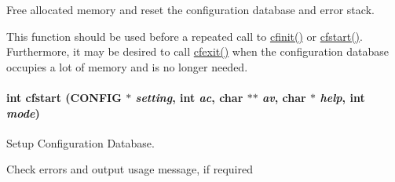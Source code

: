 Free allocated memory and reset the configuration database and error stack. 

This function should be used before a repeated call to \hyperlink{group__cflib__core_ge593ff607f853bd5fc16a16bb6759314}{cfinit()} or \hyperlink{group__cflib__core_gdcf24d678203bd09a0a3e05b8a986c65}{cfstart()}. Furthermore, it may be desired to call \hyperlink{group__cflib__core_g47bfff42f432b3e8b5b9f12b695e60db}{cfexit()} when the configuration database occupies a lot of memory and is no longer needed. \hypertarget{group__cflib__core_gdcf24d678203bd09a0a3e05b8a986c65}{
\paragraph[{cfstart}]{\setlength{\rightskip}{0pt plus 5cm}int cfstart ({\bf CONFIG} $\ast$ {\em setting}, \/  int {\em ac}, \/  char $\ast$$\ast$ {\em av}, \/  char $\ast$ {\em help}, \/  int {\em mode})}\hfill}
\label{group__cflib__core_gdcf24d678203bd09a0a3e05b8a986c65}


Setup Configuration Database. 

Check errors and output usage message, if required

